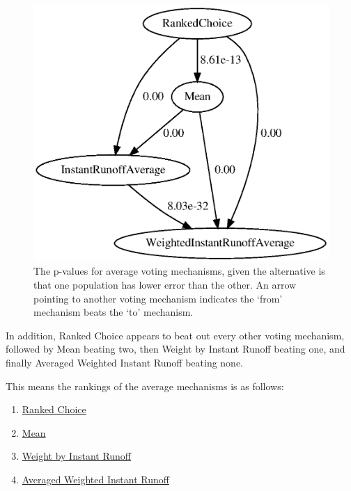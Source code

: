 \begin{figure}[htbp]
    \centering
    \includegraphics[scale=0.75]
    {./content/figures/voting_mechanisms/average-mechanisms-p-values.gv}
    \caption{The p-values for average voting mechanisms, given the alternative is
    that one population has lower error than the other.
    An arrow pointing to another voting mechanism indicates the `from' mechanism
    beats the `to' mechanism.}
    \label{fig:average-mechanisms-p-values}
\end{figure}

In addition, Ranked Choice appears to beat out every other voting mechanism, followed
by Mean beating two, then Weight by Instant Runoff beating one, and finally Averaged
Weighted Instant Runoff beating none.
\begin{samepage}
    This means the rankings of the average mechanisms is as follows:
    \begin{enumerate}
        \item \hyperref[para:avg-ranked-choice]{Ranked Choice}
        \item \hyperref[para:mean]{Mean}
        \item \hyperref[para:avg-instant-runoff]{Weight by Instant Runoff}
        \item \hyperref[para:avg-weighted-instant-runoff]{Averaged Weighted Instant
        Runoff}
    \end{enumerate}
\end{samepage}

